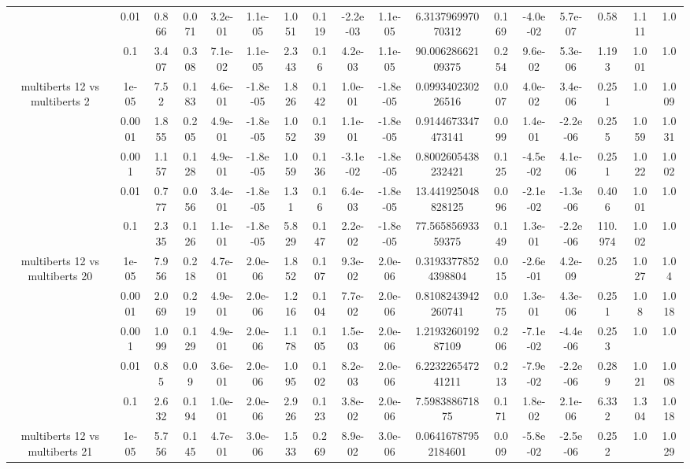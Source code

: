 \begin{tabular}{|c|c|c|c|c|c|c|c|c|c|c|c|c|c|c|c|c|}
 & 0.01 & 0.866 & 0.071 & 3.2e-01 & 1.1e-05 & 1.051 & 0.119 & -2.2e-03 & 1.1e-05 & 6.313796997070312 & 0.169 & -4.0e-02 & 5.7e-07 & 0.58 & 1.111 & 1.0 \\
 & 0.1 & 3.407 & 0.308 & 7.1e-02 & 1.1e-05 & 2.343 & 0.16 & 4.2e-03 & 1.1e-05 & 90.00628662109375 & 0.254 & 9.6e-02 & 5.3e-06 & 1.193 & 1.001 & 1.0 \\
\hline
\multirow{5}{*}{multiberts 12 vs multiberts 2} & 1e-05 & 7.52 & 0.183 & 4.6e-01 & -1.8e-05 & 1.826 & 0.142 & 1.0e-01 & -1.8e-05 & 0.099340230226516 & 0.007 & 4.0e-02 & 3.4e-06 & 0.251 & 1.0 & 1.009 \\
 & 0.0001 & 1.855 & 0.205 & 4.9e-01 & -1.8e-05 & 1.052 & 0.139 & 1.1e-01 & -1.8e-05 & 0.9144673347473141 & 0.099 & 1.4e-01 & -2.2e-06 & 0.255 & 1.059 & 1.031 \\
 & 0.001 & 1.157 & 0.128 & 4.9e-01 & -1.8e-05 & 1.059 & 0.136 & -3.1e-02 & -1.8e-05 & 0.8002605438232421 & 0.125 & -4.5e-02 & 4.1e-06 & 0.251 & 1.022 & 1.002 \\
 & 0.01 & 0.777 & 0.056 & 3.4e-01 & -1.8e-05 & 1.31 & 0.16 & 6.4e-03 & -1.8e-05 & 13.441925048828125 & 0.096 & -2.1e-02 & -1.3e-06 & 0.406 & 1.001 & 1.0 \\
 & 0.1 & 2.335 & 0.126 & 1.1e-01 & -1.8e-05 & 5.829 & 0.147 & 2.2e-02 & -1.8e-05 & 77.56585693359375 & 0.149 & 1.3e-01 & -2.2e-06 & 110.974 & 1.002 & 1.0 \\
\hline
\multirow{5}{*}{multiberts 12 vs multiberts 20} & 1e-05 & 7.956 & 0.218 & 4.7e-01 & 2.0e-06 & 1.852 & 0.107 & 9.3e-02 & 2.0e-06 & 0.31933778524398804 & 0.015 & -2.6e-01 & 4.2e-09 & 0.25 & 1.027 & 1.04 \\
 & 0.0001 & 2.069 & 0.219 & 4.9e-01 & 2.0e-06 & 1.216 & 0.104 & 7.7e-02 & 2.0e-06 & 0.8108243942260741 & 0.075 & 1.3e-01 & 4.3e-06 & 0.251 & 1.08 & 1.018 \\
 & 0.001 & 1.099 & 0.129 & 4.9e-01 & 2.0e-06 & 1.178 & 0.105 & 1.5e-03 & 2.0e-06 & 1.219326019287109 & 0.206 & -7.1e-02 & -4.4e-06 & 0.253 & 1.0 & 1.0 \\
 & 0.01 & 0.85 & 0.09 & 3.6e-01 & 2.0e-06 & 1.095 & 0.102 & 8.2e-03 & 2.0e-06 & 6.223226547241211 & 0.213 & -7.9e-02 & -2.2e-06 & 0.289 & 1.021 & 1.008 \\
 & 0.1 & 2.632 & 0.194 & 1.0e-01 & 2.0e-06 & 2.926 & 0.123 & 3.8e-02 & 2.0e-06 & 7.598388671875 & 0.171 & 1.8e-02 & 2.1e-06 & 6.332 & 1.304 & 1.018 \\
\hline
\multirow{5}{*}{multiberts 12 vs multiberts 21} & 1e-05 & 5.756 & 0.145 & 4.7e-01 & 3.0e-06 & 1.533 & 0.269 & 8.9e-02 & 3.0e-06 & 0.06416787952184601 & 0.009 & -5.8e-02 & -2.5e-06 & 0.252 & 1.0 & 1.029 \\

\end{tabular}
